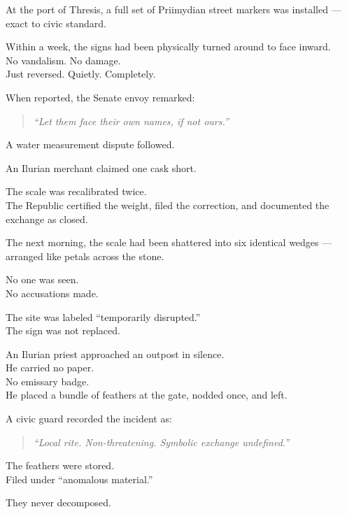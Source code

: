 \documentclass[12pt]{article}
\begin{document}
At the port of Thresis, a full set of Priimydian street markers was installed — exact to civic standard.

Within a week, the signs had been physically turned around to face inward.\\
No vandalism. No damage.\\
Just reversed. Quietly. Completely.

When reported, the Senate envoy remarked:

\begin{quote}
\textit{“Let them face their own names, if not ours.”}
\end{quote}

\vspace{1em}

A water measurement dispute followed.

An Ilurian merchant claimed one cask short.

The scale was recalibrated twice.\\
The Republic certified the weight, filed the correction, and documented the exchange as closed.

The next morning, the scale had been shattered into six identical wedges — arranged like petals across the stone.

No one was seen.\\
No accusations made.

The site was labeled ``temporarily disrupted.”\\
The sign was not replaced.

\vspace{1em}

An Ilurian priest approached an outpost in silence.\\
He carried no paper.\\
No emissary badge.\\
He placed a bundle of feathers at the gate, nodded once, and left.

A civic guard recorded the incident as:

\begin{quote}
\textit{“Local rite. Non-threatening. Symbolic exchange undefined.”}
\end{quote}

The feathers were stored.\\
Filed under ``anomalous material.”

They never decomposed.

\vspace{1em}
\end{document}
